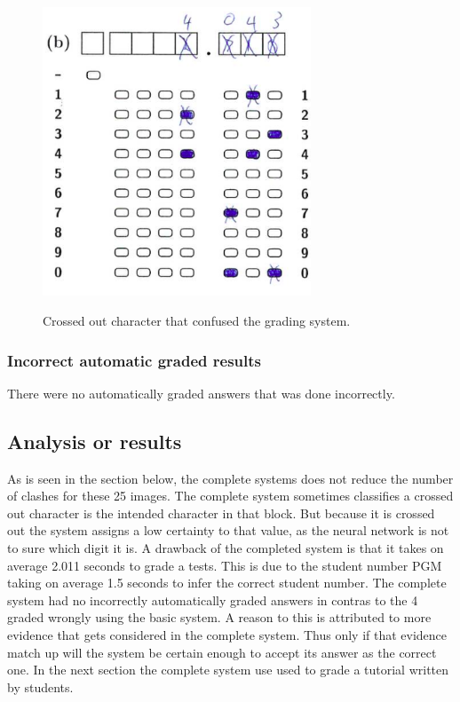 \begin{figure}
  \centering
  \includegraphics[width=8cm]{crossedOutCharacter}\\
  \caption{Crossed out character that confused the grading system.}
  \label{fig:crossedOutCharacter}
\end{figure}

\subsubsection{Incorrect automatic graded results}

There were no automatically graded answers that was done incorrectly.

\subsection{Analysis or results}

As is seen in the section below, the complete systems does not reduce the number of clashes for these 25 images. The complete system sometimes classifies a crossed out character is the intended character in that block. But because it is crossed out the system assigns a low certainty to that value, as the neural network is not to sure which digit it is. A drawback of the completed system is that it takes on average 2.011 seconds to grade a tests. This is due to the student number PGM taking on average 1.5 seconds to infer the correct student number. The complete system had no incorrectly automatically graded answers in contras to the 4 graded wrongly using the basic system. A reason to this is attributed to more evidence that gets considered in the complete system. Thus only if that evidence match up will the system be certain enough to accept its answer as the correct one. In the next section the complete system use used to grade a tutorial written by students. 

